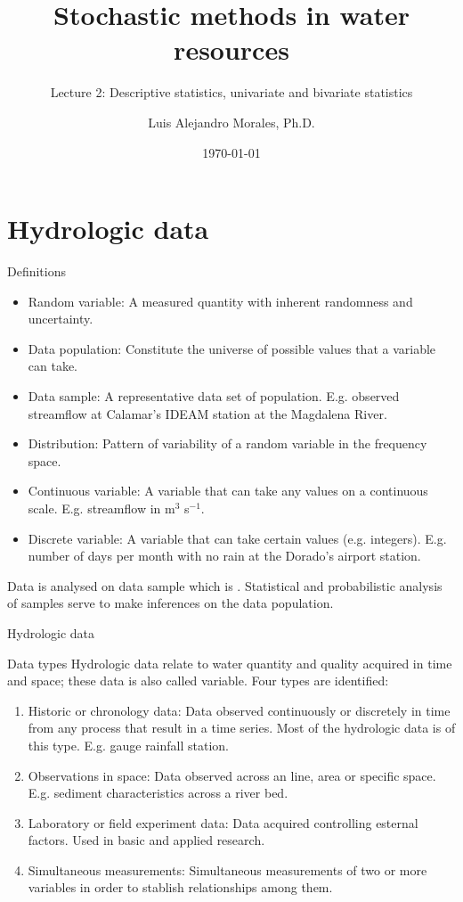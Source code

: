 \documentclass[8pt]{beamer}
\title{Stochastic methods in water resources}
\subtitle{Lecture 2: Descriptive statistics, univariate and bivariate statistics}
\author{Luis Alejandro Morales, Ph.D.}
\institute{Universidad Nacional de Colombia} %
\date{\today}
\begin{document}
\begin{frame}
    \titlepage
\end{frame}

\section{Hydrologic data}

\begin{frame}{Definitions}
    \begin{itemize}
        \item \alert{Random variable}: A measured quantity with inherent randomness and uncertainty.
        \item \alert{Data population}:  Constitute the universe of possible values that a variable can take.
        \item \alert{Data sample}: A representative data set of population. E.g. observed streamflow at Calamar's IDEAM station at the Magdalena River.
        \item \alert{Distribution}: Pattern of variability of a random variable in the frequency space. 
        \item \alert{Continuous variable}: A variable that can take any values on a continuous scale. E.g. streamflow in m$^3$ s$^{-1}$.
        \item \alert{Discrete variable}: A variable that can take certain values (e.g. integers). E.g. number of days per month with no rain at the Dorado's airport station.
       
    \end{itemize}

Data is analysed on \alert{data sample} which is . Statistical and probabilistic analysis of samples serve to make \alert{inferences} on the data population.
\end{frame}
\begin{frame}{Hydrologic data}
    \begin{block}{Data types}
        Hydrologic data relate to water quantity and quality acquired in time and space; these data is also called \alert{variable}. Four types are identified:
        \begin{enumerate}
            \item \alert{Historic or chronology data}: Data observed continuously or discretely in time from any process that result in a time series. Most of the hydrologic data is of this type. E.g. gauge rainfall station. 
            \item \alert{Observations in space}: Data observed across an line, area or specific space. E.g. sediment characteristics across a river bed.
            \item \alert{Laboratory or field experiment data}: Data acquired controlling esternal factors. Used in basic and applied research. 
            \item \alert{Simultaneous measurements}: Simultaneous measurements of two or more variables in order to stablish relationships among them.
        \end{enumerate}
    \end{block}    
\end{frame}
\end{document}
